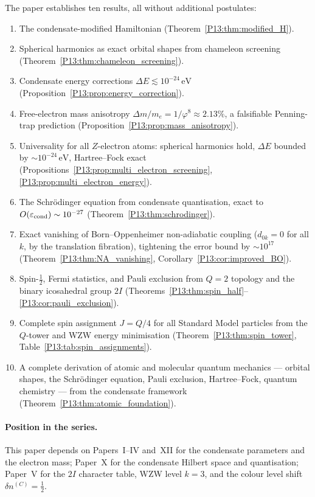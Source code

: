 \documentclass[11pt,a4paper]{article}
\theoremstyle{definition}
\theoremstyle{remark}
\newcommand{\vp}{\varphi}
\newcommand{\eps}{\varepsilon}
\begin{document}
The paper establishes ten results, all without additional postulates:
\begin{enumerate}[noitemsep]
\item The condensate-modified Hamiltonian (Theorem~\ref{P13:thm:modified_H}).
\item Spherical harmonics as exact orbital shapes from chameleon screening
  (Theorem~\ref{P13:thm:chameleon_screening}).
\item Condensate energy corrections $\Delta E\lesssim10^{-24}\,\mathrm{eV}$
  (Proposition~\ref{P13:prop:energy_correction}).
\item Free-electron mass anisotropy $\Delta m/m_e=1/\vp^8\approx2.13\%$,
  a falsifiable Penning-trap prediction (Proposition~\ref{P13:prop:mass_anisotropy}).
\item Universality for all $Z$-electron atoms: spherical harmonics hold,
  $\Delta E$ bounded by $\sim10^{-24}\,\mathrm{eV}$, Hartree--Fock exact
  (Propositions~\ref{P13:prop:multi_electron_screening},
  \ref{P13:prop:multi_electron_energy}).
\item The Schr\"odinger equation from condensate quantisation, exact to
  $O(\eps_{\rm cond})\sim10^{-27}$ (Theorem~\ref{P13:thm:schrodinger}).
\item Exact vanishing of Born--Oppenheimer non-adiabatic coupling
  ($d_{0k}=0$ for all $k$, by the translation fibration), tightening
  the error bound by $\sim10^{17}$
  (Theorem~\ref{P13:thm:NA_vanishing}, Corollary~\ref{P13:cor:improved_BO}).
\item Spin-$\tfrac{1}{2}$, Fermi statistics, and Pauli exclusion from
  $Q=2$ topology and the binary icosahedral group $2I$
  (Theorems~\ref{P13:thm:spin_half}--\ref{P13:cor:pauli_exclusion}).
\item Complete spin assignment $J=Q/4$ for all Standard Model particles
  from the $Q$-tower and WZW energy minimisation
  (Theorem~\ref{P13:thm:spin_tower}, Table~\ref{P13:tab:spin_assignments}).
\item A complete derivation of atomic and molecular quantum mechanics ---
  orbital shapes, the Schr\"odinger equation, Pauli exclusion, Hartree--Fock,
  quantum chemistry --- from the condensate framework
  (Theorem~\ref{P13:thm:atomic_foundation}).
\end{enumerate}

\paragraph{Position in the series.}
This paper depends on Papers~I--IV and~XII for the condensate parameters
and the electron mass; Paper~X for the condensate Hilbert space and
quantisation; Paper~V for the $2I$ character table, WZW level $k=3$,
and the colour level shift $\delta n^{(C)}=\tfrac{1}{2}$.
\end{document}
